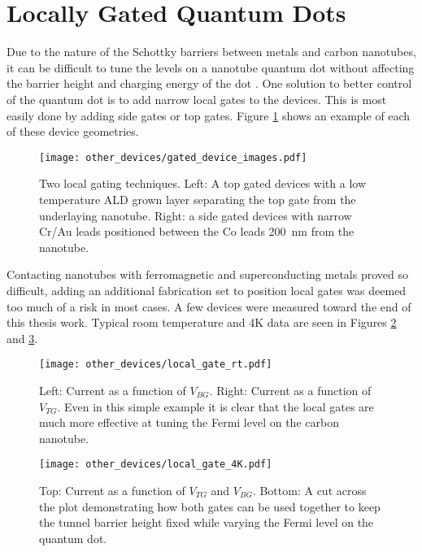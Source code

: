 \section{Locally Gated Quantum Dots}

Due to the nature of the Schottky barriers between metals and carbon nanotubes, it can be difficult to tune the levels on a nanotube quantum dot without affecting the barrier height and charging energy of the dot \cite{Schottky1938, Svensson2011}. One solution to better control of the quantum dot is to add narrow local gates to the devices. This is most easily done by adding side gates or top gates. Figure \ref{fig:local_gating} shows an example of each of these device geometries.

\begin{figure}
    \centering
    \texttt{[image: other\_devices/gated\_device\_images.pdf]}
    \caption{Two local gating techniques. Left: A top gated devices with a low temperature ALD grown  layer separating the top gate from the underlaying nanotube. Right: a side gated devices with narrow Cr/Au leads positioned between the Co leads \SI{200}{\nano\meter} from the nanotube.}
    \label{fig:local_gating}
\end{figure}

Contacting nanotubes with ferromagnetic and superconducting metals proved so difficult, adding an additional fabrication set to position local gates was deemed too much of a risk in most cases. A few devices were measured toward the end of this thesis work. Typical room temperature and 4K data are seen in Figures \ref{fig:local_gate_rt} and \ref{fig:local_gate_4K}.

\begin{figure}
    \centering
    \texttt{[image: other\_devices/local\_gate\_rt.pdf]}
    \caption{Left: Current as a function of $V_{BG}$. Right: Current as a function of $V_{TG}$. Even in this simple example it is clear that the local gates are much more effective at tuning the Fermi level on the carbon nanotube.}
    \label{fig:local_gate_rt}
\end{figure}

\begin{figure}
    \centering
    \texttt{[image: other\_devices/local\_gate\_4K.pdf]}
    \caption{Top: Current as a function of $V_{TG}$ and $V_{BG}$. Bottom: A cut across the plot demonstrating how both gates can be used together to keep the tunnel barrier height fixed while varying the Fermi level on the quantum dot.}
    \label{fig:local_gate_4K}
\end{figure}

